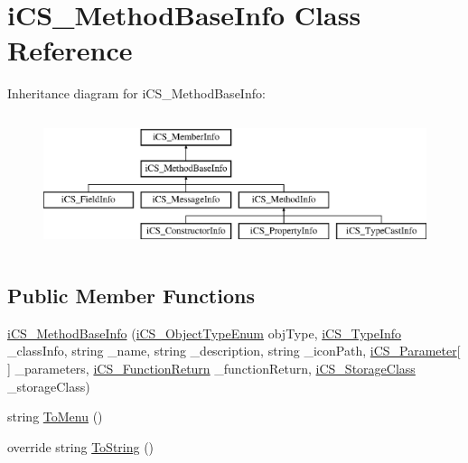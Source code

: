 \hypertarget{classi_c_s___method_base_info}{\section{i\+C\+S\+\_\+\+Method\+Base\+Info Class Reference}
\label{classi_c_s___method_base_info}
}
Inheritance diagram for i\+C\+S\+\_\+\+Method\+Base\+Info\+:\begin{figure}[H]
\begin{center}
\leavevmode
\includegraphics[height=4.000000cm]{classi_c_s___method_base_info}
\end{center}
\end{figure}
\subsection*{Public Member Functions}
\begin{DoxyCompactItemize}
\item 
\hyperlink{classi_c_s___method_base_info_a4e5d574a105c9cc21423cdcec450620b}{i\+C\+S\+\_\+\+Method\+Base\+Info} (\hyperlink{i_c_s___object_type_enum_8cs_ae6c3dd6d8597380b56d94908eb431547}{i\+C\+S\+\_\+\+Object\+Type\+Enum} obj\+Type, \hyperlink{classi_c_s___type_info}{i\+C\+S\+\_\+\+Type\+Info} \+\_\+class\+Info, string \+\_\+name, string \+\_\+description, string \+\_\+icon\+Path, \hyperlink{classi_c_s___parameter}{i\+C\+S\+\_\+\+Parameter}\mbox{[}$\,$\mbox{]} \+\_\+parameters, \hyperlink{classi_c_s___function_return}{i\+C\+S\+\_\+\+Function\+Return} \+\_\+function\+Return, \hyperlink{i_c_s___storage_class_8cs_a4e1bb1da155050e4b0d0118f813194aa}{i\+C\+S\+\_\+\+Storage\+Class} \+\_\+storage\+Class)
\item 
string \hyperlink{classi_c_s___method_base_info_a7f84a3dd7065f351c6a85e035c431cee}{To\+Menu} ()
\item 
override string \hyperlink{classi_c_s___method_base_info_a1ad39574000a2b961c77d5876abc7f74}{To\+String} ()
\end{DoxyCompactItemize}
